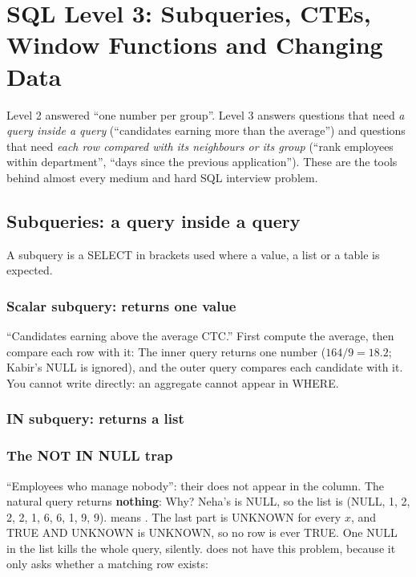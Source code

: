 \chapter{SQL Level 3: Subqueries, CTEs, Window Functions and Changing Data}

Level 2 answered ``one number per group''. Level 3 answers questions that need \emph{a query inside a query} (``candidates earning more than the average'')
and questions that need \emph{each row compared with its neighbours or its group} (``rank employees within department'', ``days since the previous
application''). These are the tools behind almost every medium and hard SQL interview problem.

\section{Subqueries: a query inside a query}
A subquery is a SELECT in brackets used where a value, a list or a table is expected.

\subsection{Scalar subquery: returns one value}
``Candidates earning above the average CTC.'' First compute the average, then compare each row with it:
The inner query  returns one number ($164/9 = 18.2$; Kabir's NULL is ignored), and the outer query compares
each candidate with it. You cannot write  directly: an aggregate cannot appear in WHERE.

\subsection{IN subquery: returns a list}

\subsection{The NOT IN NULL trap}
``Employees who manage nobody'': their  does not appear in the  column. The natural query returns \textbf{nothing}:
Why? Neha's  is NULL, so the list is (NULL, 1, 2, 2, 2, 1, 6, 6, 1, 9, 9).  means
. The last part is UNKNOWN for every $x$, and TRUE AND UNKNOWN is UNKNOWN, so no row is ever TRUE. One NULL in the list
kills the whole query, silently.  does not have this problem, because it only asks whether a matching row exists:

